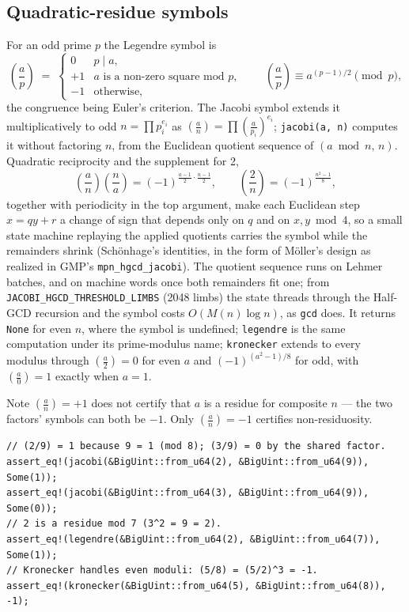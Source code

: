 \documentclass[11pt]{article}
\newcommand{\code}[1]{\texttt{#1}}
\newcommand{\jac}[2]{\left(\frac{#1}{#2}\right)}
\begin{document}
\subsection{Quadratic-residue symbols}

For an odd prime $p$ the Legendre symbol is
\begin{equation}
\jac{a}{p} \;=\;
\begin{cases}
0 & p \mid a,\\
+1 & a \text{ is a non-zero square mod } p,\\
-1 & \text{otherwise},
\end{cases}
\qquad
\jac{a}{p} \equiv a^{(p-1)/2} \pmod{p},
\end{equation}
the congruence being Euler's criterion. The Jacobi symbol extends it
multiplicatively to odd $n = \prod p_i^{e_i}$ as
$\jac{a}{n} = \prod \jac{a}{p_i}^{e_i}$; \code{jacobi(a, n)} computes it
without factoring $n$, from the Euclidean quotient sequence of
$(a \bmod n,\, n)$. Quadratic reciprocity and the supplement for 2,
\begin{equation}
\jac{a}{n}\jac{n}{a} = (-1)^{\frac{a-1}{2}\cdot\frac{n-1}{2}},
\qquad
\jac{2}{n} = (-1)^{\frac{n^2-1}{8}},
\end{equation}
together with periodicity in the top argument, make each Euclidean step
$x = qy + r$ a change of sign that depends only on $q$ and on $x, y \bmod 4$,
so a small state machine replaying the applied quotients carries the symbol
while the remainders shrink (Sch\"onhage's identities, in the form of
M\"oller's design as realized in GMP's \code{mpn\_hgcd\_jacobi}). The
quotient sequence runs on Lehmer batches, and on machine words once both
remainders fit one; from \code{JACOBI\_HGCD\_THRESHOLD\_LIMBS} (2048 limbs)
the state threads through the Half-GCD recursion and the symbol costs
$O(M(n) \log n)$, as \code{gcd} does. It returns \code{None} for even $n$, where the symbol
is undefined; \code{legendre} is the same computation under its
prime-modulus name; \code{kronecker} extends to every modulus through
$\jac{a}{2} = 0$ for even $a$ and $(-1)^{(a^2-1)/8}$ for odd, with
$\jac{a}{0} = 1$ exactly when $a = 1$.

Note $\jac{a}{n} = +1$ does not certify that $a$ is a residue for
composite $n$ --- the two factors' symbols can both be $-1$. Only
$\jac{a}{n} = -1$ certifies non-residuosity.

\begin{lstlisting}
// (2/9) = 1 because 9 = 1 (mod 8); (3/9) = 0 by the shared factor.
assert_eq!(jacobi(&BigUint::from_u64(2), &BigUint::from_u64(9)), Some(1));
assert_eq!(jacobi(&BigUint::from_u64(3), &BigUint::from_u64(9)), Some(0));
// 2 is a residue mod 7 (3^2 = 9 = 2).
assert_eq!(legendre(&BigUint::from_u64(2), &BigUint::from_u64(7)), Some(1));
// Kronecker handles even moduli: (5/8) = (5/2)^3 = -1.
assert_eq!(kronecker(&BigUint::from_u64(5), &BigUint::from_u64(8)), -1);
\end{lstlisting}
\end{document}
